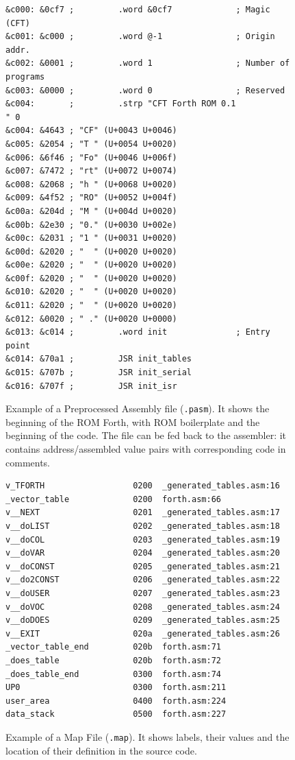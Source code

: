 \begin{figure}
\begin{lstlisting}[language=cftasm]
&c000: &0cf7 ;         .word &0cf7             ; Magic (CFT)
&c001: &c000 ;         .word @-1               ; Origin addr.
&c002: &0001 ;         .word 1                 ; Number of programs
&c003: &0000 ;         .word 0                 ; Reserved
&c004:       ;         .strp "CFT Forth ROM 0.1            " 0
&c004: &4643 ; "CF" (U+0043 U+0046)
&c005: &2054 ; "T " (U+0054 U+0020)
&c006: &6f46 ; "Fo" (U+0046 U+006f)
&c007: &7472 ; "rt" (U+0072 U+0074)
&c008: &2068 ; "h " (U+0068 U+0020)
&c009: &4f52 ; "RO" (U+0052 U+004f)
&c00a: &204d ; "M " (U+004d U+0020)
&c00b: &2e30 ; "0." (U+0030 U+002e)
&c00c: &2031 ; "1 " (U+0031 U+0020)
&c00d: &2020 ; "  " (U+0020 U+0020)
&c00e: &2020 ; "  " (U+0020 U+0020)
&c00f: &2020 ; "  " (U+0020 U+0020)
&c010: &2020 ; "  " (U+0020 U+0020)
&c011: &2020 ; "  " (U+0020 U+0020)
&c012: &0020 ; " ." (U+0020 U+0000)
&c013: &c014 ;         .word init              ; Entry point
&c014: &70a1 ;         JSR init_tables
&c015: &707b ;         JSR init_serial
&c016: &707f ;         JSR init_isr
\end{lstlisting}
\caption[Preprocessed Assembly Output Example]{\label{fig:pasm-file} Example of
  a Preprocessed Assembly file (\texttt{.pasm}). It shows the beginning of the
  ROM Forth, with ROM boilerplate and the beginning of the code. The file can
  be fed back to the assembler: it contains address/assembled value pairs with
  corresponding code in comments.}
\end{figure}


\begin{figure}
\begin{lstlisting}[numbers=none]
v_TFORTH                  0200  _generated_tables.asm:16
_vector_table             0200  forth.asm:66
v__NEXT                   0201  _generated_tables.asm:17
v__doLIST                 0202  _generated_tables.asm:18
v__doCOL                  0203  _generated_tables.asm:19
v__doVAR                  0204  _generated_tables.asm:20
v__doCONST                0205  _generated_tables.asm:21
v__do2CONST               0206  _generated_tables.asm:22
v__doUSER                 0207  _generated_tables.asm:23
v__doVOC                  0208  _generated_tables.asm:24
v__doDOES                 0209  _generated_tables.asm:25
v__EXIT                   020a  _generated_tables.asm:26
_vector_table_end         020b  forth.asm:71
_does_table               020b  forth.asm:72
_does_table_end           0300  forth.asm:74
UP0                       0300  forth.asm:211
user_area                 0400  forth.asm:224
data_stack                0500  forth.asm:227
\end{lstlisting}
\caption[Map File Example]{\label{fig:map-file} Example of a Map File
  (\texttt{.map}). It shows labels, their values and the location of their
  definition in the source code.}
\end{figure}

